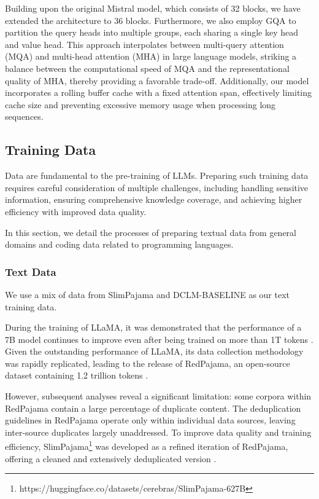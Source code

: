 Building upon the original Mistral model, which consists of 32 blocks, we have extended the architecture to 36 blocks. Furthermore, we also employ GQA to partition the query heads into multiple groups, each sharing a single key head and value head. This approach interpolates between multi-query attention (MQA) and multi-head attention (MHA) in large language models, striking a balance between the computational speed of MQA and the representational quality of MHA, thereby providing a favorable trade-off. Additionally, our model incorporates a rolling buffer cache with a fixed attention span, effectively limiting cache size and preventing excessive memory usage when processing long sequences.




\subsection{Training Data}\label{sec3.3}

Data are fundamental to the pre-training of LLMs. Preparing such training data requires careful consideration of multiple challenges, including handling sensitive information, ensuring comprehensive knowledge coverage, and achieving higher efficiency with improved data quality. 

In this section, we detail the processes of preparing textual data from general domains and coding data related to programming languages.




\subsubsection{Text Data}

We use a mix of data from SlimPajama \cite{cerebras2023slimpajama} and DCLM-BASELINE \cite{li2024datacomp} as our text training data.

During the training of LLaMA, it was demonstrated that the performance of a 7B model continues to improve even after being trained on more than 1T tokens \cite{touvron2023llama}. Given the outstanding performance of LLaMA, its data collection methodology was rapidly replicated, leading to the release of RedPajama, an open-source dataset containing 1.2 trillion tokens \cite{weber2024redpajama}.


However, subsequent analyses reveal a significant limitation: some corpora within RedPajama contain a large percentage of duplicate content. The deduplication guidelines in RedPajama operate only within individual data sources, leaving inter-source duplicates largely unaddressed. To improve data quality and training efficiency, SlimPajama\footnote{https://huggingface.co/datasets/cerebras/SlimPajama-627B} was developed as a refined iteration of RedPajama, offering a cleaned and extensively deduplicated version \cite{cerebras2023slimpajama}.




